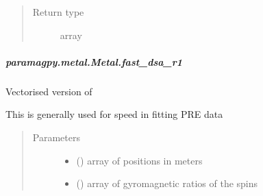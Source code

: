 \documentclass[a4paper,10pt,english,openany,oneside]{sphinxmanual}
\begin{document}
\begin{fulllineitems}
\begin{fulllineitems}
\begin{fulllineitems}
\begin{quote}
\begin{description}
\item[{Return type}] \leavevmode
\sphinxAtStartPar
array

\end{description}\end{quote}

\end{fulllineitems}



\subparagraph{paramagpy.metal.Metal.fast\_dsa\_r1}
\label{\detokenize{reference/generated/paramagpy.metal.Metal.fast_dsa_r1:paramagpy-metal-metal-fast-dsa-r1}}\label{\detokenize{reference/generated/paramagpy.metal.Metal.fast_dsa_r1::doc}}

\begin{fulllineitems}
\label{\detokenize{reference/generated/paramagpy.metal.Metal.fast_dsa_r1:paramagpy.metal.Metal.fast_dsa_r1}}
\sphinxAtStartPar
Vectorised version of {\hyperref[\detokenize{reference/generated/paramagpy.metal.Metal.dsa_r1:paramagpy.metal.Metal.dsa_r1}]{}}

\sphinxAtStartPar
This is generally used for speed in fitting PRE data
\begin{quote}\begin{description}
\item[{Parameters}] \leavevmode\begin{itemize}
\item {} 
\sphinxAtStartPar
{} (\sphinxstyleliteralemphasis{\sphinxupquote{ (}}\sphinxstyleliteralemphasis{\sphinxupquote{,}}\sphinxstyleliteralemphasis{\sphinxupquote{)}}) \textendash{} array of positions in meters

\item {} 
\sphinxAtStartPar
{} (\sphinxstyleliteralemphasis{\sphinxupquote{ (}}\sphinxstyleliteralemphasis{\sphinxupquote{,}}\sphinxstyleliteralemphasis{\sphinxupquote{)}}) \textendash{} array of gyromagnetic ratios of the spins


\end{itemize}
\end{description}
\end{quote}
\end{fulllineitems}
\end{fulllineitems}
\end{fulllineitems}
\end{document}
